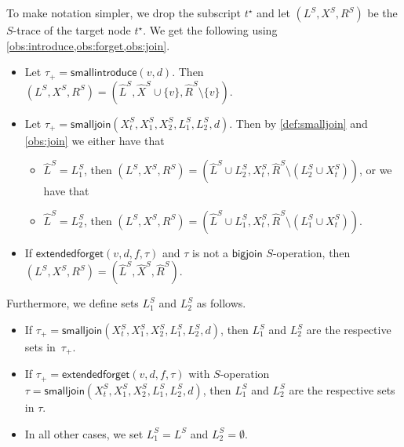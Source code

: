 \documentclass[a4paper,UKenglish,cleveref, autoref, thm-restate, numberwithinsect]{lipics-v2021}
\newcommand{\bigjoin}{\mathsf{bigjoin}}
\newcommand{\smallintroduce}{\mathsf{smallintroduce}}
\newcommand{\smalljoin}{\mathsf{smalljoin}}
\newcommand{\extendedforget}{\mathsf{extendedforget}}
\begin{document}
To make notation simpler, we drop the subscript ${t^\star}$ and let $(L^S, X^S, R^S)$ be the $S$-trace of the target node ${t^\star}$. We get the following using \cref{obs:introduce,obs:forget,obs:join}.
\begin{itemize}
    \item Let $\tau_+=\smallintroduce(v,d)$. Then $(L^S, X^S, R^S)=(\hat{L}^S, \hat{X}^S\cup\{v\}, \hat{R}^S\setminus\{v\})$.
    \item Let $\tau_+=\smalljoin(X^S_t,X_1^S,X_2^S,L_{1}^S, L_{2}^S,d)$. Then by \cref{def:smalljoin} and \cref{obs:join} we either have that 
\begin{itemize}    
    \item $\hat{L}^S=L_{1}^S$, then $(L^S, X^S, R^S)=(\hat{L}^S\cup L_{2}^S, X^S_t, \hat{R}^S\setminus (L_{2}^S\cup X^S_t))$, or we have that 
    \item $\hat{L}^S=L_{2}^S$, then $(L^S, X^S, R^S)=(\hat{L}^S\cup L_{1}^S, X^S_t, \hat{R}^S\setminus (L_{1}^S\cup X^S_t))$.
    \end{itemize}
    \item If $\extendedforget(v,d,f,\tau)$ and $\tau$ is not a $\bigjoin$ $S$-operation, then $(L^S, X^S, R^S)=(\hat{L}^S, \hat{X}^S, \hat{R}^S)$.
\end{itemize}

Furthermore, we define sets $L_{1}^S$ and $L_{2}^S$ as follows. 
\begin{itemize}
\item If $\tau_+=\smalljoin(X^S_t,X_1^S,X_2^S,L_{1}^S, L_{2}^S,d)$, then $L_{1}^S$ and $L_{2}^S$ are the respective sets in~$\tau_+$.
\item If $\tau_+=\extendedforget(v,d,f,\tau)$ with $S$-operation $\tau=\smalljoin(X^S_t,X_1^S,X_2^S,L_{1}^S, L_{2}^S,d)$, then $L_{1}^S$ and $L_{2}^S$ are the respective sets in $\tau$.

\item In all other cases, we set $L_{1}^S=L^S$ and $L_{2}^S=\emptyset$.
\end{itemize}
\end{document}

